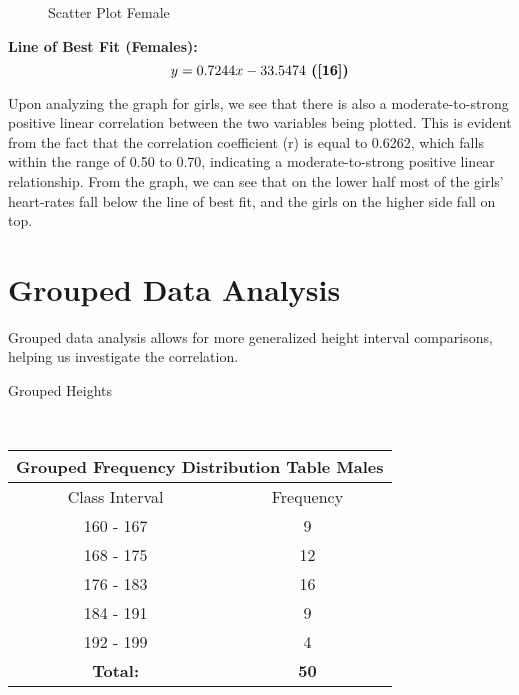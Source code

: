 \begin{figure}
    \caption{Scatter Plot Female}
    \label{fig:figure2}
\end{figure}
\begin{center}
    \textbf{Line of Best Fit (Females):}
    \begin{equation}
    y = 0.7244x - 33.5474 \textbf{     (\ref{16})}
    \end{equation}
\end{center}
Upon analyzing the graph for girls, we see that there is also a moderate-to-strong positive linear correlation between the two variables being plotted. This is evident from the fact that the correlation coefficient (r) is equal to 0.6262, which falls within the range of 0.50 to 0.70, indicating a moderate-to-strong positive linear relationship. From the graph, we can see that on the lower half most of the girls' heart-rates fall below the line of best fit, and the girls on the higher side fall on top.  
\\
\section{Grouped Data Analysis}
Grouped data analysis allows for more generalized height interval comparisons, helping us investigate the correlation.
\begin{center}
\begin{table}[h]
    \centering
    \caption{Grouped Heights}
    \label{tab:table3}
\end{table}
\vspace{0.5cm}
\\
\def\arraystretch{1}
{\setlength{\tabcolsep}{5em}
\begin{tabular}{|| c | c ||} 
\hline
\multicolumn{2}{||c||}{Grouped Frequency Distribution Table \textbf{Males}} \\
 \hline
 \hline
   Class Interval & Frequency\\ [0.5ex] 
 \hline
160 - 167 & 9\\
 \hline
168 - 175	& 12\\
 \hline
176 - 183	& 16\\
 \hline
184 - 191	& 9\\
 \hline
192 - 199	& 4\\
 \hline
  \textbf{Total:} & \textbf{50}\\
  \hline
\end{tabular}}
\end{center}

